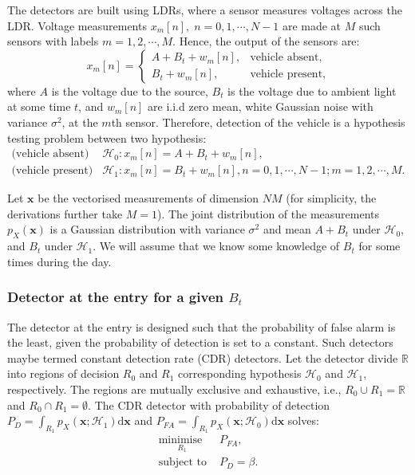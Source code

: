 \documentclass[11pt]{article}
\newcommand{\bx}{\mathbf{x}}
\newcommand{\rr}{\mathbb{R}}
\newcommand{\cH}{\mathcal{H}}
\newcommand{\dd}{\mathrm{d}}
\begin{document}
The detectors are built using LDRs, where a sensor measures voltages across the LDR. Voltage measurements $x_{m}[n], \; n=0,1,\cdots,N-1$ are made at $M$ such sensors with labels $m=1,2,\cdots,M$. Hence, the output of the sensors are:
\begin{equation}
	x_{m}[n] = \begin{cases}
		A + B_{t} + w_{m}[n], &\text{vehicle absent}, \\
		B_{t} + w_{m}[n], & \text{vehicle present},
	\end{cases}
\label{eq:LDRout}
\end{equation}
where $A$ is the voltage due to the source, $B_{t}$ is the voltage due to ambient light at some time $t$, and $w_{m}[n]$ are i.i.d zero mean, white Gaussian noise with variance $\sigma^{2}$, at the $m$th sensor. Therefore, detection of the vehicle is a hypothesis testing problem between two hypothesis:
\begin{equation}
\begin{split}
	\text{(vehicle absent) } &\cH_{0}: x_{m}[n] = A + B_{t} + w_{m}[n], \\
	\text{(vehicle present) } &\cH_{1}: x_{m}[n] = B_{t} + w_{m}[n], n=0,1,\cdots,N-1; m=1,2,\cdots,M.
\end{split}
\label{eq:hypothesis}
\end{equation}

Let $\bx$ be the vectorised measurements of dimension $NM$ (for simplicity, the derivations further take $M=1$). The joint distribution of the measurements $p_{X}(\bx)$ is a Gaussian distribution with variance $\sigma^{2}$ and mean $A+B_{t}$ under $\cH_{0}$, and $B_{t}$ under $\cH_{1}$. We will assume that we know some knowledge of $B_{t}$ for some times during the day.


\subsubsection{Detector at the entry for a given $B_{t}$}
\label{subsubsec:entryDetector}

The detector at the entry is designed such that the probability of false alarm is the least, given the probability of detection is set to a constant. Such detectors maybe termed constant detection rate (CDR) detectors. Let the detector divide $\rr$ into regions of decision $R_{0}$ and $R_{1}$ corresponding hypothesis $\cH_{0}$ and $\cH_{1}$, respectively. The regions are mutually exclusive and exhaustive, i.e., $R_{0} \cup R_{1} = \rr$ and $R_{0} \cap R_{1} = \emptyset$. The CDR detector with probability of detection $P_{D} = \int_{R_{1}} p_{X}(\bx;\cH_{1}) \dd\bx$ and $P_{FA} = \int_{R_{1}} p_{X}(\bx;\cH_{0}) \dd\bx$ solves:
\begin{equation}
\begin{split}
	\underset{R_{1}}{\text{minimise }}& P_{FA}, \\
	\text{subject to }& P_{D} = \beta.
\end{split}
\label{eq:CDRopt}
\end{equation}
\end{document}
